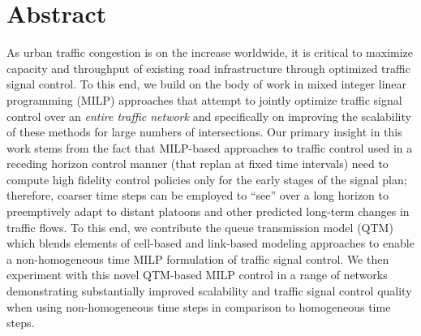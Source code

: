 \section*{Abstract}



As urban traffic congestion is on the increase worldwide, it is
critical to maximize capacity and throughput of existing road
infrastructure through optimized traffic signal control.  To this end,
we build on the body of work in mixed integer linear programming
(MILP) approaches that attempt to jointly optimize traffic signal
control over an \emph{entire traffic network} and specifically on
improving the scalability of these methods for large numbers of
intersections.  Our primary insight in this work stems from the fact
that MILP-based approaches to traffic control used in a receding
horizon control manner (that replan at fixed time intervals) need to
compute high fidelity control policies only for the early stages of
the signal plan; therefore, coarser time steps can be employed to
``see'' over a long horizon to preemptively adapt to distant platoons
and other predicted long-term changes in traffic flows.  To this end,
we contribute the queue transmission model (QTM) which blends elements
of cell-based and link-based modeling approaches to enable a
non-homogeneous time MILP formulation of traffic signal control.
%
We then experiment with this novel QTM-based MILP control in a range
of networks demonstrating substantially improved scalability and
traffic signal control quality when using non-homogeneous time steps
in comparison to homogeneous time steps.
%


%
